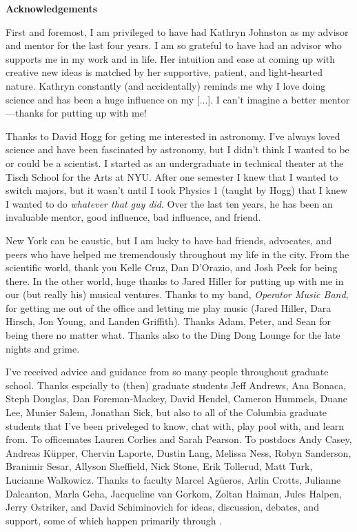 \newpage

\begin{center}
    {\large \bf Acknowledgements }
\end{center}

\vspace{-0.2cm}

First and foremost, I am privileged to have had Kathryn Johnston as my advisor
and mentor for the last four years. I am so grateful to have had an advisor who
supports me in my work and in life. Her intuition and ease at coming up with
creative new ideas is matched by her supportive, patient, and light-hearted
nature. Kathryn constantly (and accidentally) reminds me why I love doing
science and has been a huge influence on my [...]. I can't imagine a better
mentor---thanks for putting up with me!

Thanks to David Hogg for geting me interested in astronomy. I've always loved
science and have been fascinated by astronomy, but I didn't think I wanted to be
or could be a scientist. I started as an undergraduate in technical theater at
the Tisch School for the Arts at NYU. After one semester I knew that I wanted to
switch majors, but it wasn't until I took Physics 1 (taught by Hogg) that I knew
I wanted to do \emph{whatever that guy did}. Over the last ten years, he has
been an invaluable mentor, good influence, bad influence, and friend.

New York can be caustic, but I am lucky to have had friends, advocates, and
peers who have helped me tremendously throughout my life in the city. From the
scientific world, thank you Kelle Cruz, Dan D'Orazio, and Josh Peek for being
there. In the other world, huge thanks to Jared Hiller for putting up with me in
our (but really his) musical ventures. Thanks to my band, \emph{Operator Music
Band}, for getting me out of the office and letting me play music (Jared Hiller,
Dara Hirsch, Jon Young, and Landen Griffith). Thanks Adam, Peter, and Sean for
being there no matter what. Thanks also to the Ding Dong Lounge for the late
nights and grime.

I've received advice and guidance from so many people throughout graduate
school. Thanks espcially to (then) graduate students Jeff Andrews, Ana Bonaca,
Steph Douglas, Dan Foreman-Mackey, David Hendel, Cameron Hummels, Duane Lee,
Munier Salem, Jonathan Sick, but also to all of the Columbia graduate students
that I've been priveleged to know, chat with, play pool with, and learn from. To
officemates Lauren Corlies and Sarah Pearson. To postdocs Andy Casey, Andreas
K\"upper, Chervin Laporte, Dustin Lang, Melissa Ness, Robyn Sanderson, Branimir
Sesar, Allyson Sheffield, Nick Stone, Erik Tollerud, Matt Turk, Lucianne
Walkowicz. Thanks to faculty Marcel Ag\"ueros, Arlin Crotts, Julianne Dalcanton,
Marla Geha, Jacqueline van Gorkom, Zoltan Haiman, Jules Halpen, Jerry Ostriker,
and David Schiminovich for ideas, discussion, debates, and support, some of
which happen primarily through .


